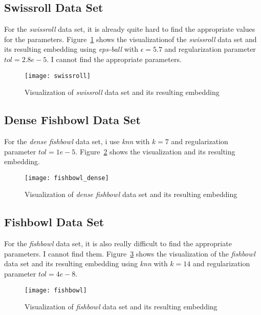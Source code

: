 \subsection{Swissroll Data Set}
\label{ass6:swissroll}

For the \textit{swissroll} data set, it is already quite hard to find the appropriate values for the parameters. Figure~\ref{fig:lleswissroll} shows the visualizationof the \textit{swissroll} data set and its resulting embedding using \textit{eps-ball} with $\epsilon=5.7$ and regularization parameter $tol=2.8e-5$. I cannot find the appropriate parameters.

\begin{figure}[h!]
	\centering
	\texttt{[image: swissroll]}
	\caption{Visualization of \textit{swissroll} data set and its resulting embedding}
	\label{fig:lleswissroll}
\end{figure}

\subsection{Dense Fishbowl Data Set}
\label{ass6:densefishbowl}

For the \textit{dense fishbowl} data set, i use \textit{knn} with $k=7$ and regularization parameter $tol=1e-5$. Figure~\ref{fig:lledensefishbowl} shows the visualization and its resulting embedding.

\begin{figure}[h!]
	\centering
	\texttt{[image: fishbowl\_dense]}
	\caption{Visualization of \textit{dense fishbowl} data set and its resulting embedding}
	\label{fig:lledensefishbowl}
\end{figure}

\subsection{Fishbowl Data Set}
\label{ass6:fishbowl}

For the \textit{fishbowl} data set, it is also really difficult to find the appropriate parameters. I cannot find them. Figure~\ref{fig:llefishbowl} shows the visualization of the \textit{fishbowl} data set and its resulting embedding using \textit{knn} with $k=14$ and regularization parameter $tol=4e-8$.

\begin{figure}[h!]
	\centering
	\texttt{[image: fishbowl]}
	\caption{Visualization of \textit{fishbowl} data set and its resulting embedding}
	\label{fig:llefishbowl}
\end{figure}

